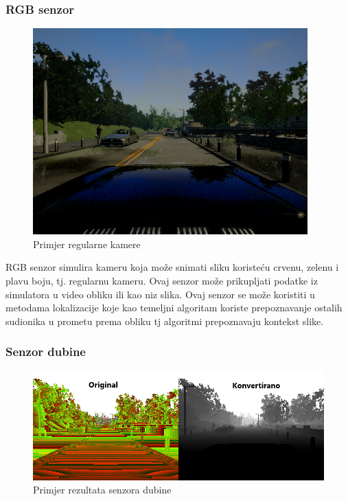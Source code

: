 \subsubsection{RGB senzor}
\begin{figure}[ht!]
  \centering
  \includegraphics[scale=0.5]{images/rgb_example.png}
  \caption{Primjer regularne kamere\cite{carla:sensors}}
  \label{fig:rgb_exmaple}
\end{figure}

RGB senzor simulira kameru koja može snimati sliku koristeću crvenu, zelenu i plavu boju, tj. regularnu kameru. Ovaj senzor može prikupljati podatke iz simulatora u video obliku ili kao niz slika. Ovaj senzor se može koristiti u metodama lokalizacije koje kao temeljni algoritam koriste prepoznavanje ostalih sudionika u prometu prema obliku tj algoritmi prepoznavaju kontekst slike.

\subsubsection{Senzor dubine}
\begin{figure}[ht!]
  \centering
  \includegraphics[scale=0.5]{images/depth_example.png}
  \caption{Primjer rezultata senzora dubine\cite{carla:sensors}}
  \label{fig:depth_exmaple}
\end{figure}

